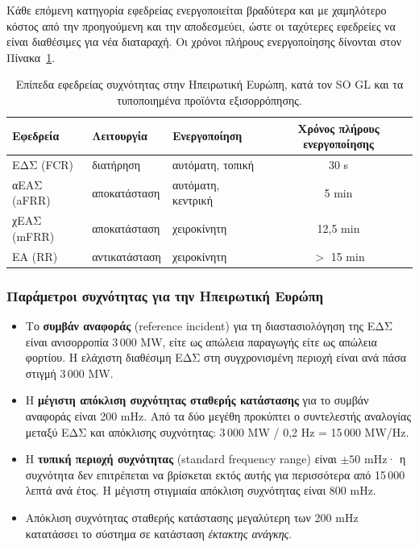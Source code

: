 Κάθε επόμενη κατηγορία εφεδρείας ενεργοποιείται βραδύτερα και με χαμηλότερο κόστος από την
προηγούμενη και την αποδεσμεύει, ώστε οι ταχύτερες εφεδρείες να είναι διαθέσιμες για νέα
διαταραχή. Οι χρόνοι πλήρους ενεργοποίησης δίνονται στον Πίνακα~\ref{tab:reserves}.

\begin{table}[!htbp]
\centering
\begin{tabular}{lllc}
\hline
Εφεδρεία & Λειτουργία & Ενεργοποίηση & Χρόνος πλήρους ενεργοποίησης \\
\hline
ΕΔΣ (FCR)   & διατήρηση      & αυτόματη, τοπική   & 30 s \\
αΕΑΣ (aFRR) & αποκατάσταση   & αυτόματη, κεντρική & 5 min \\
χΕΑΣ (mFRR) & αποκατάσταση   & χειροκίνητη        & 12,5 min \\
ΕΑ (RR)     & αντικατάσταση  & χειροκίνητη        & $>$ 15 min \\
\hline
\end{tabular}
\caption{Επίπεδα εφεδρείας συχνότητας στην Ηπειρωτική Ευρώπη, κατά τον SO GL και τα
τυποποιημένα προϊόντα εξισορρόπησης.}
\label{tab:reserves}
\end{table}

\subsubsection*{Παράμετροι συχνότητας για την Ηπειρωτική Ευρώπη}

\begin{itemize}
\item Το \textbf{συμβάν αναφοράς} (reference incident) για τη διαστασιολόγηση της ΕΔΣ είναι
      ανισορροπία 3\,000 MW, είτε ως απώλεια παραγωγής είτε ως απώλεια φορτίου. Η ελάχιστη
      διαθέσιμη ΕΔΣ στη συγχρονισμένη περιοχή είναι ανά πάσα στιγμή 3\,000 MW.
\item Η \textbf{μέγιστη απόκλιση συχνότητας σταθερής κατάστασης} για το συμβάν αναφοράς
      είναι 200 mHz. Από τα δύο μεγέθη προκύπτει ο συντελεστής αναλογίας μεταξύ ΕΔΣ και
      απόκλισης συχνότητας: 3\,000 MW / 0,2 Hz = 15\,000 MW/Hz.
\item Η \textbf{τυπική περιοχή συχνότητας} (standard frequency range) είναι $\pm 50$ mHz· η
      συχνότητα δεν επιτρέπεται να βρίσκεται εκτός αυτής για περισσότερα από
      15\,000 λεπτά ανά έτος. Η μέγιστη στιγμιαία απόκλιση συχνότητας είναι 800 mHz.
\item Απόκλιση συχνότητας σταθερής κατάστασης μεγαλύτερη των 200 mHz κατατάσσει το σύστημα
      σε κατάσταση \emph{έκτακτης ανάγκης}.
\end{itemize}

